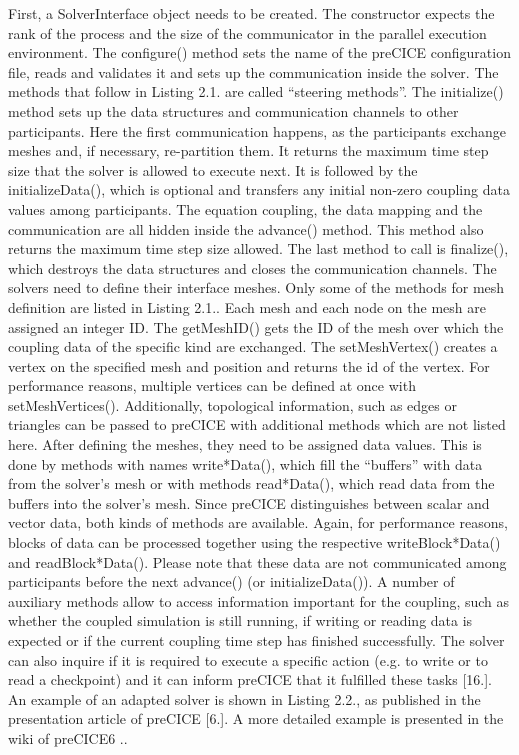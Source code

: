 First, a SolverInterface object needs to be created.
The constructor expects the rank of the process and the size of the communicator in the
parallel execution environment. The configure() method sets the name of the preCICE
configuration file, reads and validates it and sets up the communication inside the solver.
The methods that follow in Listing 2.1. are called “steering methods”. The initialize()
method sets up the data structures and communication channels to other participants. Here
the first communication happens, as the participants exchange meshes and, if necessary,
re-partition them. It returns the maximum time step size that the solver is allowed to
execute next. It is followed by the initializeData(), which is optional and transfers any
initial non-zero coupling data values among participants. The equation coupling, the data
mapping and the communication are all hidden inside the advance() method. This method
also returns the maximum time step size allowed. The last method to call is finalize(),
which destroys the data structures and closes the communication channels.
The solvers need to define their interface meshes. Only some of the methods for mesh
definition are listed in Listing 2.1.. Each mesh and each node on the mesh are assigned an
integer ID. The getMeshID() gets the ID of the mesh over which the coupling data of the
specific kind are exchanged. The setMeshVertex() creates a vertex on the specified mesh
and position and returns the id of the vertex. For performance reasons, multiple vertices
can be defined at once with setMeshVertices(). Additionally, topological information,
such as edges or triangles can be passed to preCICE with additional methods which are not
listed here.
After defining the meshes, they need to be assigned data values. This is done by methods
with names write*Data(), which fill the “buffers” with data from the solver’s mesh or
with methods read*Data(), which read data from the buffers into the solver’s mesh. Since
preCICE distinguishes between scalar and vector data, both kinds of methods are available.
Again, for performance reasons, blocks of data can be processed together using the
respective writeBlock*Data() and readBlock*Data(). Please note that these data are
not communicated among participants before the next advance() (or initializeData()).
A number of auxiliary methods allow to access information important for the coupling,
such as whether the coupled simulation is still running, if writing or reading data is expected
or if the current coupling time step has finished successfully. The solver can also inquire if
it is required to execute a specific action (e.g. to write or to read a checkpoint) and it can
inform preCICE that it fulfilled these tasks [16.].
An example of an adapted solver is shown in Listing 2.2., as published in the presentation
article of preCICE [6.]. A more detailed example is presented in the wiki of preCICE6
..




